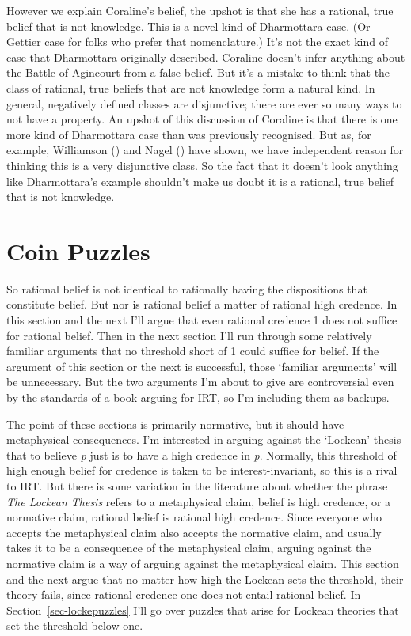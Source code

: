\documentclass[
  12pt,
  letterpaper,
]{scrbook}
\begin{document}
However we explain Coraline's belief, the upshot is that she has a
rational, true belief that is not knowledge. This is a novel kind of
Dharmottara case. (Or Gettier case for folks who prefer that
nomenclature.) It's not the exact kind of case that Dharmottara
originally described. Coraline doesn't infer anything about the Battle
of Agincourt from a false belief. But it's a mistake to think that the
class of rational, true beliefs that are not knowledge form a natural
kind. In general, negatively defined classes are disjunctive; there are
ever so many ways to not have a property. An upshot of this discussion
of Coraline is that there is one more kind of Dharmottara case than was
previously recognised. But as, for example, Williamson
() and Nagel
() have shown, we have
independent reason for thinking this is a very disjunctive class. So the
fact that it doesn't look anything like Dharmottara's example shouldn't
make us doubt it is a rational, true belief that is not knowledge.

\section{Coin Puzzles}\label{sec-lockecoin}

So rational belief is not identical to rationally having the
dispositions that constitute belief. But nor is rational belief a matter
of rational high credence. In this section and the next I'll argue that
even rational credence 1 does not suffice for rational belief. Then in
the next section I'll run through some relatively familiar arguments
that no threshold short of 1 could suffice for belief. If the argument
of this section or the next is successful, those `familiar arguments'
will be unnecessary. But the two arguments I'm about to give are
controversial even by the standards of a book arguing for IRT, so I'm
including them as backups.

The point of these sections is primarily normative, but it should have
metaphysical consequences. I'm interested in arguing against the
`Lockean' thesis that to believe \emph{p} just is to have a high
credence in \emph{p}. Normally, this threshold of high enough belief for
credence is taken to be interest-invariant, so this is a rival to IRT.
But there is some variation in the literature about whether the phrase
\emph{The Lockean Thesis} refers to a metaphysical claim, belief is high
credence, or a normative claim, rational belief is rational high
credence. Since everyone who accepts the metaphysical claim also accepts
the normative claim, and usually takes it to be a consequence of the
metaphysical claim, arguing against the normative claim is a way of
arguing against the metaphysical claim. This section and the next argue
that no matter how high the Lockean sets the threshold, their theory
fails, since rational credence one does not entail rational belief. In
Section~\ref{sec-lockepuzzles} I'll go over puzzles that arise for
Lockean theories that set the threshold below one.
\end{document}
